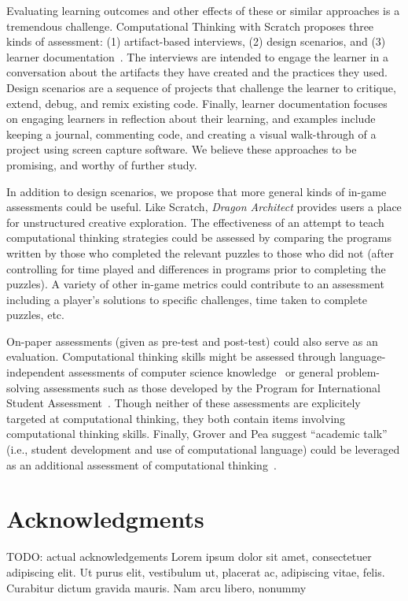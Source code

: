 \documentclass[conference]{IEEEtran}
\newcommand{\TODO}[1]{{\color{red} TODO: #1}}
\begin{document}
Evaluating learning outcomes and other effects of these or similar approaches is a tremendous challenge. 
Computational Thinking with Scratch proposes three kinds of assessment: (1) artifact-based interviews, (2) design scenarios, and (3) learner documentation~\cite{scratchedCT}. 
The interviews are intended to engage the learner in a conversation about the artifacts they have created and the practices they used. 
Design scenarios are a sequence of projects that challenge the learner to critique, extend, debug, and remix existing code. 
Finally, learner documentation focuses on engaging learners in reflection about their learning, and examples include keeping a journal, commenting code, and creating a visual walk-through of a project using screen capture software. 
We believe these approaches to be promising, and worthy of further study. 

In addition to design scenarios, we propose that more general kinds of in-game assessments could be useful. 
Like Scratch, \emph{Dragon Architect} provides users a place for unstructured creative exploration. 
The effectiveness of an attempt to teach computational thinking strategies could be assessed by comparing the programs written by those who completed the relevant puzzles to those who did not (after controlling for time played and differences in programs prior to completing the puzzles).
A variety of other in-game metrics could contribute to an assessment including a player's solutions to specific challenges, time taken to complete puzzles, etc. 

On-paper assessments (given as pre-test and post-test) could also serve as an evaluation.
Computational thinking skills might be assessed through language-independent assessments of computer science knowledge~\cite{tew2011fcs1} or general problem-solving assessments such as those developed by the Program for International Student Assessment~\cite{pisa}. Though neither of these assessments are explicitely targeted at computational thinking, they both contain items involving computational thinking skills. 
Finally, Grover and Pea suggest ``academic talk'' (i.e., student development and use of computational language) could be leveraged as an additional assessment of computational thinking~\cite{grover2013computational}. 

\section{Acknowledgments}
\TODO{actual acknowledgements}
Lorem ipsum dolor sit amet, consectetuer adipiscing elit. Ut purus elit, vestibulum ut, placerat ac, adipiscing vitae, felis. Curabitur dictum gravida mauris. Nam arcu libero, nonummy


 
\end{document}

